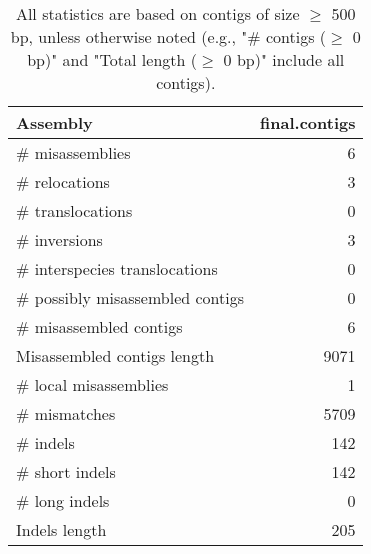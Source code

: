 \documentclass[12pt,a4paper]{article}
\begin{document}
\begin{table}[ht]
\begin{center}
\caption{All statistics are based on contigs of size $\geq$ 500 bp, unless otherwise noted (e.g., "\# contigs ($\geq$ 0 bp)" and "Total length ($\geq$ 0 bp)" include all contigs).}
\begin{tabular}{|l*{1}{|r}|}
\hline
Assembly & final.contigs \\ \hline
\# misassemblies & 6 \\ \hline
\hspace{5mm}\# relocations & 3 \\ \hline
\hspace{5mm}\# translocations & 0 \\ \hline
\hspace{5mm}\# inversions & 3 \\ \hline
\hspace{5mm}\# interspecies translocations & 0 \\ \hline
\# possibly misassembled contigs & 0 \\ \hline
\# misassembled contigs & 6 \\ \hline
Misassembled contigs length & 9071 \\ \hline
\# local misassemblies & 1 \\ \hline
\# mismatches & 5709 \\ \hline
\# indels & 142 \\ \hline
\hspace{5mm}\# short indels & 142 \\ \hline
\hspace{5mm}\# long indels & 0 \\ \hline
Indels length & 205 \\ \hline
\end{tabular}
\end{center}
\end{table}
\end{document}

